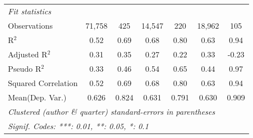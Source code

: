 \begin{tabular}{lcccccc}
   \midrule
   \emph{Fit statistics}\\
   Observations                                               & 71,758        & 425           & 14,547  & 220           & 18,962         & 105\\  
   R$^2$                                                      & 0.52          & 0.69          & 0.68    & 0.80          & 0.63           & 0.94\\  
   Adjusted R$^2$                                             & 0.31          & 0.35          & 0.27    & 0.22          & 0.33           & -0.23\\  
   Pseudo R$^2$                                               & 0.33          & 0.46          & 0.54    & 0.65          & 0.44           & 0.97\\  
   Squared Correlation                                        & 0.52          & 0.69          & 0.68    & 0.80          & 0.63           & 0.94\\  
Mean(Dep. Var.) & 0.626 & 0.824 & 0.631 & 0.791 & 0.630 & 0.909 \\
   \midrule \midrule
   \multicolumn{7}{l}{\emph{Clustered (author \& quarter) standard-errors in parentheses}}\\
   \multicolumn{7}{l}{\emph{Signif. Codes: ***: 0.01, **: 0.05, *: 0.1}}\\
\end{tabular}
\par\endgroup
